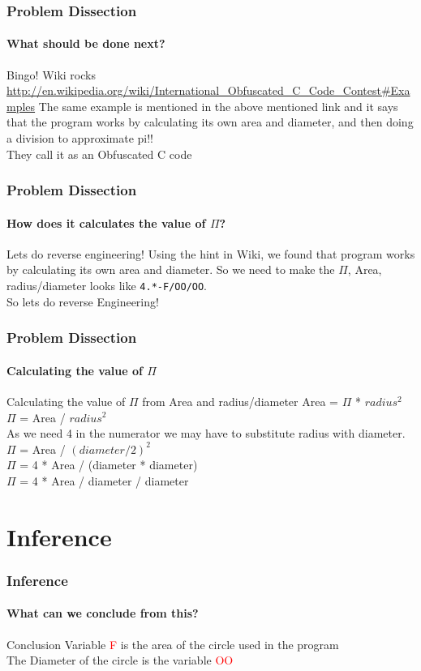 \documentclass[12pt]{beamer}
\begin{document}
\begin{frame}
	\frametitle{Problem Dissection}
	\framesubtitle{What should be done next?}
	\begin{center}
		\small {Bingo! Wiki rocks} \\
		{\tiny \url{http://en.wikipedia.org/wiki/International_Obfuscated_C_Code_Contest\#Examples}}
		{\tiny The same example is mentioned in the above mentioned link and it says that the program works by calculating its own area and diameter, and then doing a division to approximate pi!!} \\
		{\small They call it as an Obfuscated C code}
	\end{center}
\end{frame}

\begin{frame}
	\frametitle{Problem Dissection}
	\framesubtitle{How does it calculates the value of $\Pi$?}
	\begin{block}{Lets do reverse engineering!}
		Using the hint in Wiki, we found that program works by calculating its own area and diameter. So we need to make the $\Pi$, Area, radius/diameter looks like \texttt{4.*-F/OO/OO}. \\ So lets do reverse Engineering!
	\end{block}
\end{frame}

\begin{frame}
	\frametitle{Problem Dissection}
	\framesubtitle{Calculating the value of $\Pi$ }
	\begin{block}{Calculating the value of $\Pi$ from Area and radius/diameter}
		Area = $\Pi$ * $radius^{2}$ \\
		$\Pi$ = Area / $radius^{2}$ \\
		As we need 4 in the numerator we may have to substitute radius with diameter.\\
		$\Pi$ = Area / $(diameter/2)^{2}$ \\
		$\Pi$ = 4 * Area / (diameter * diameter) \\
		$\Pi$ = 4 * Area / diameter / diameter \\
	\end{block}
\end{frame}	

\section{Inference}
\begin{frame}
	\frametitle{Inference}
	\framesubtitle{What can we conclude from this?}
	\begin{block}{Conclusion}
		Variable \textcolor{red}{F} is the area of the circle used in the program \\
		The Diameter of the circle is the variable \textcolor{red}{OO}
	\end{block}
\end{frame}
\end{document}
